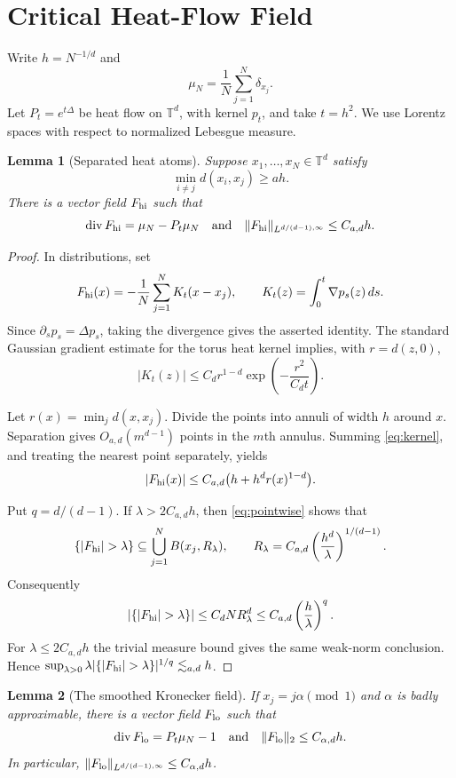 \documentclass[11pt]{amsart}
\newtheorem{lemma}{Lemma}
\newcommand{\T}{\mathbb T}
\newcommand{\muN}{\mu_N}
\begin{document}
\section*{Critical Heat-Flow Field}

Write $h=N^{-1/d}$ and
\[
 \muN=\frac1N\sum_{j=1}^N\delta_{x_j}.
\]
Let $P_t=e^{t\Delta}$ be heat flow on $\T^d$, with kernel $p_t$, and
take $t=h^2$.  We use Lorentz spaces with respect to normalized Lebesgue
measure.

\begin{lemma}[Separated heat atoms]\label{lem:high}
Suppose $x_1,\ldots,x_N\in\T^d$ satisfy
\[
 \min_{i\ne j}d(x_i,x_j)\geq a h.
\]
There is a vector field $F_{\rm hi}$ such that
\[
 \operatorname{div}F_{\rm hi}=\muN-P_t\muN
 \quad\text{and}\quad
 \|F_{\rm hi}\|_{L^{d/(d-1),\infty}}
 \leq C_{a,d}h.
\]
\end{lemma}

\begin{proof}
In distributions, set
\[
 F_{\rm hi}(x)
 =-\frac1N\sum_{j=1}^N K_t(x-x_j),
 \qquad
 K_t(z)=\int_0^t\nabla p_s(z)\,ds.
\]
Since $\partial_sp_s=\Delta p_s$, taking the divergence gives the asserted
identity.  The standard Gaussian gradient estimate for the torus heat kernel
implies, with $r=d(z,0)$,
\begin{equation}\label{eq:kernel}
 |K_t(z)|\leq C_d r^{1-d}
 \exp\!\left(-\frac{r^2}{C_dt}\right).
\end{equation}

Let $r(x)=\min_jd(x,x_j)$.  Divide the points into annuli of width $h$
around $x$.  Separation gives $O_{a,d}(m^{d-1})$ points in the $m$th
annulus.  Summing \eqref{eq:kernel}, and treating the nearest point
separately, yields
\begin{equation}\label{eq:pointwise}
 |F_{\rm hi}(x)|
 \leq C_{a,d}\bigl(h+h^d r(x)^{1-d}\bigr).
\end{equation}

Put $q=d/(d-1)$.  If $\lambda>2C_{a,d}h$, then
\eqref{eq:pointwise} shows that
\[
 \{|F_{\rm hi}|>\lambda\}
 \subseteq\bigcup_{j=1}^N B(x_j,R_\lambda),
 \qquad
 R_\lambda=C_{a,d}
 \left(\frac{h^d}{\lambda}\right)^{1/(d-1)}.
\]
Consequently
\[
 |\{|F_{\rm hi}|>\lambda\}|
 \leq C_d N R_\lambda^d
 \leq C_{a,d}\left(\frac h\lambda\right)^q.
\]
For $\lambda\leq2C_{a,d}h$ the trivial measure bound gives the same
weak-norm conclusion.  Hence
$\sup_{\lambda>0}\lambda
|\{|F_{\rm hi}|>\lambda\}|^{1/q}\lesssim_{a,d}h$.
\end{proof}

\begin{lemma}[The smoothed Kronecker field]\label{lem:low}
If $x_j=j\alpha\pmod1$ and $\alpha$ is badly approximable, there is a
vector field $F_{\rm lo}$ such that
\[
 \operatorname{div}F_{\rm lo}=P_t\muN-1
 \quad\text{and}\quad
 \|F_{\rm lo}\|_2\leq C_{\alpha,d}h.
\]
In particular,
$\|F_{\rm lo}\|_{L^{d/(d-1),\infty}}\leq C_{\alpha,d}h$.
\end{lemma}
\end{document}
